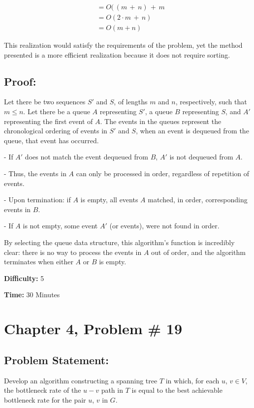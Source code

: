 \documentclass{article}
\newcommand{\tab}[1][1]{\noindent \hspace{#1cm} }
\begin{document}
\begin{align*}
&= O( \, (m \, + \, n) \, + \, m \\
&= O( 2 \cdot m \, + \, n) \\
&= \boxed{ O(m + n)}
\end{align*}

\noindent This realization would satisfy the requirements of the problem, yet the method presented is a more efficient realization because it does not require sorting.

\subsection*{Proof:}
Let there be two sequences $S'$ and $S$, of lengths $m$ and $n$, respectively, such that $m \leq n$.
Let there be a queue $A$ representing $S'$, a queue $B$ representing $S$, and $A'$ representing the first event of $A$.
The events in the queues represent the chronological ordering of events in $S'$ and $S$, when an event is dequeued from the queue, that event has occurred.

\tab - If $A'$ does not match the event dequeued from $B$, $A'$ is not dequeued from $A$.

\tab - Thus, the events in $A$ can only be processed in order, regardless of repetition of events.

\tab - Upon termination:  if $A$ is empty, all events $A$ matched, in order, corresponding events in $B$.

\tab - If $A$ is not empty, some event $A'$ (or events), were not found in order.

\hrulefill

\noindent By selecting the queue data structure, this algorithm's function is incredibly clear:  there is no way to process the events in $A$ out of order, and the algorithm terminates when either $A$ or $B$ is empty. \newline

\noindent \textbf{Difficulty:}  5

\noindent \textbf{Time:}  30 Minutes

\newpage
\section*{Chapter 4, Problem \# 19}
\subsection*{Problem Statement:}
Develop an algorithm constructing a spanning tree $T$ in which, for each $u$, $v \in V$, the bottleneck rate of the $u-v$ path in $T$ is equal to the best achievable bottleneck rate for the pair $u$, $v$ in $G$.
\end{document}
